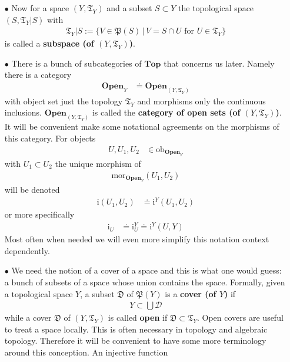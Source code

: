 \begin{exa}
\begin{enumerate}
\item[$\bullet$]
Now for a space $(Y,\mathfrak{T}_{Y})$ and a subset $S \subset Y$ the topological space $(S,\mathfrak{T}_{Y} \vert S)$ with
\begin{align*}
  \mathfrak{T}_{Y} \vert S
  :=
  \lbrace
      V
      \in
      \mathfrak{P}(S)
    \,
    \vert
    \,
      V
      =
      S
      \cap
      U
      \text{ for }
      U
      \in
      \mathfrak{T}_{Y}
  \rbrace
\end{align*}
is called a \textbf{subspace (of $(Y,\mathfrak{T}_{Y})$)}.
\item[$\bullet$]
There is a bunch of subcategories of $\mathbf{Top}$ that concerns us later. Namely there is a category
\begin{align*}
  \mathbf{Open}_{Y}
  &\doteq
  \mathbf{Open}_{(Y,\mathfrak{T}_{Y})}
\end{align*}
with object set just the topology $\mathfrak{T}_{Y}$ and morphisms only the continuous inclusions. $\mathbf{Open}_{(Y,\mathfrak{T}_{Y})}$ is called the \textbf{category of open sets (of $(Y,\mathfrak{T}_{Y})$)}. It will be convenient make some notational agreements on the morphisms of this category. For objects
\begin{align*}
  U,
  U_{1},
  U_{2}
  &\in
  \mathrm{ob}_{\mathbf{Open}_{Y}}
\end{align*}
with $U_{1} \subset U_{2}$ the unique morphism of
\begin{align*}
  \mathrm{mor}_{\mathbf{Open}_{Y}}(U_{1},U_{2})
\end{align*}
will be denoted
\begin{align*}
  \mathrm{i}(U_{1},U_{2})
  &\doteq
  \mathrm{i}^{Y}(U_{1},U_{2})
\end{align*}
or more specifically
\begin{align*}
  \mathrm{i}_{U}
  &\doteq
  \mathrm{i}_{U}^{Y}
  \doteq
  \mathrm{i}^{Y}(U,Y)
\end{align*}
Most often when needed we will even more simplify this notation context dependently.
\item[$\bullet$]
We need the notion of a cover of a space and this is what one would guess: a bunch of subsets of a space whose union contains the space. Formally, given a topological space $Y$, a subset $\mathfrak{D}$ of $\mathfrak{P}(Y)$ is a \textbf{cover (of $Y$)} if
\begin{align*}
  Y
  \subset
  \bigcup
  \mathcal{D}
\end{align*}
while a cover $\mathfrak{D}$ of $(Y,\mathfrak{T}_{Y})$ is called \textbf{open} if $\mathfrak{D} \subset \mathfrak{T}_{Y}$. Open covers are useful to treat a space locally. This is often necessary in topology and algebraic topology. Therefore it will be convenient to have some more terminology around this conception. An injective function

\end{enumerate}
\end{exa}
